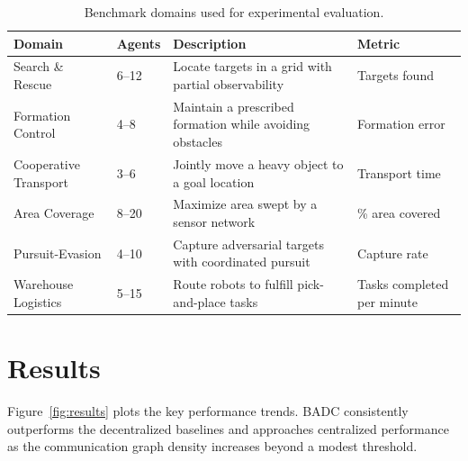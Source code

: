 \documentclass[12pt,oneside]{report}
\theoremstyle{definition}
\theoremstyle{remark}
\begin{document}
\begin{table}[htbp]
\centering
\caption{Benchmark domains used for experimental evaluation.}
\label{tab:benchmarks}
\vspace{4pt}
\begin{tabular}{@{}p{3cm} p{2cm} p{4.5cm} p{2.5cm}@{}}
\toprule
\color{jhublue}\textbf{Domain} &
\color{jhublue}\textbf{Agents} &
\color{jhublue}\textbf{Description} &
\color{jhublue}\textbf{Metric} \\
\midrule
Search \& Rescue   & 6--12 & Locate targets in a grid with partial observability  & Targets found                \\
Formation Control  & 4--8  & Maintain a prescribed formation while avoiding obstacles& Formation error              \\
Cooperative Transport & 3--6 & Jointly move a heavy object to a goal location        & Transport time               \\
Area Coverage      & 8--20 & Maximize area swept by a sensor network               & \% area covered              \\
Pursuit-Evasion    & 4--10 & Capture adversarial targets with coordinated pursuit  & Capture rate                 \\
Warehouse Logistics& 5--15 & Route robots to fulfill pick-and-place tasks          & Tasks completed per minute   \\
\bottomrule
\end{tabular}
\vspace{4pt}
\end{table}

\section{Results}

Figure~\ref{fig:results} plots the key performance trends. BADC consistently
outperforms the decentralized baselines and approaches centralized performance
as the communication graph density increases beyond a modest threshold.
\end{document}
